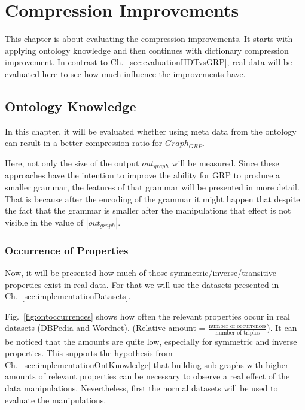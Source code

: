 \section{Compression Improvements}

This chapter is about evaluating the compression improvements. It starts with applying ontology knowledge and then continues with dictionary compression improvement. In contrast to Ch.~\ref{sec:evaluationHDTvsGRP}, real data will be evaluated here to see how much influence the improvements have.

\subsection{Ontology Knowledge}\label{sec:evaluationOntKnowledge}

In this chapter, it will be evaluated whether using meta data from the ontology can result in a better compression ratio for $Graph_{GRP}$. 

Here, not only the size of the output $out_{graph}$ will be measured. Since these approaches have the intention to improve the ability for GRP to produce a smaller grammar, the features of that grammar will be presented in more detail. That is because after the encoding of the grammar it might happen that despite the fact that the grammar is smaller after the manipulations that effect is not visible in the value of $|out_{graph}|$. 

\subsubsection{Occurrence of Properties}
Now, it will be presented how much of those symmetric/inverse/transitive properties exist in real data. For that we will use the datasets presented in Ch.~\ref{sec:implementationDatasets}. 

Fig.~\ref{fig:ontoccurrences} shows how often the relevant properties occur in real datasets (DBPedia and Wordnet). (Relative amount = $\frac{\text{number of occurrences}}{\text{number of triples}}$). It can be noticed that the amounts are quite low, especially for symmetric and inverse properties. This supports the hypothesis from Ch.~\ref{sec:implementationOntKnowledge} that building sub graphs with higher amounts of relevant properties can be necessary to observe a real effect of the data manipulations. Nevertheless, first the normal datasets will be used to evaluate the manipulations.


